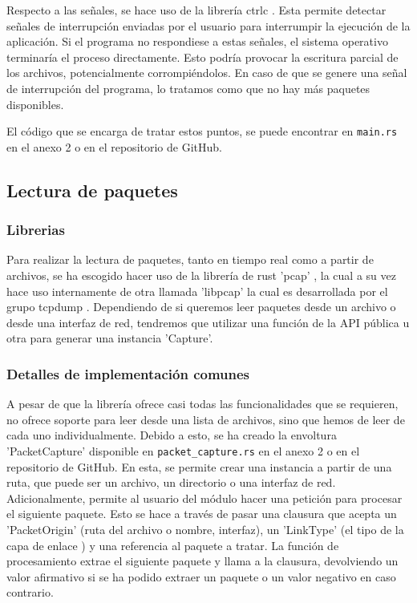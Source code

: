 Respecto a las señales, se hace uso de la librería ctrlc \cite{controlc}. Esta permite detectar señales de interrupción enviadas por el usuario para interrumpir la ejecución de la aplicación. Si el programa no respondiese a estas señales, el sistema operativo terminaría el proceso directamente. Esto podría provocar la escritura parcial de los archivos, potencialmente corrompiéndolos. En caso de que se genere una señal de interrupción del programa, lo tratamos como que no hay más paquetes disponibles.

El código que se encarga de tratar estos puntos, se puede encontrar en \texttt{main.rs} en el anexo 2 o en el repositorio de GitHub.

\subsection{Lectura de paquetes}

\subsubsection{Librerias}

Para realizar la lectura de paquetes, tanto en tiempo real como a partir de archivos, se ha escogido hacer uso de la librería de rust 'pcap' \cite{rustpcap}, la cual a su vez hace uso internamente de otra llamada 'libpcap' la cual es desarrollada por el grupo tcpdump \cite{libpcap}. Dependiendo de si queremos leer paquetes desde un archivo o desde una interfaz de red, tendremos que utilizar una función de la API pública u otra para generar una instancia 'Capture'. 

\subsubsection{Detalles de implementación comunes}

A pesar de que la librería ofrece casi todas las funcionalidades que se requieren, no ofrece soporte para leer desde una lista de archivos, sino que hemos de leer de cada uno individualmente. Debido a esto, se ha creado la envoltura 'PacketCapture' disponible en \texttt{packet\_capture.rs} en el anexo 2 o en el repositorio de GitHub. En esta, se permite crear una instancia a partir de una ruta, que puede ser un archivo, un directorio o una interfaz de red. Adicionalmente, permite al usuario del módulo hacer una petición para procesar el siguiente paquete. Esto se hace a través de pasar una clausura que acepta un 'PacketOrigin' (ruta del archivo o nombre, interfaz), un 'LinkType' (el tipo de la capa de enlace \cite{linktypetcpdump}) y una referencia al paquete a tratar. La función de procesamiento extrae el siguiente paquete y llama a la clausura, devolviendo un valor afirmativo si se ha podido extraer un paquete o un valor negativo en caso contrario.

